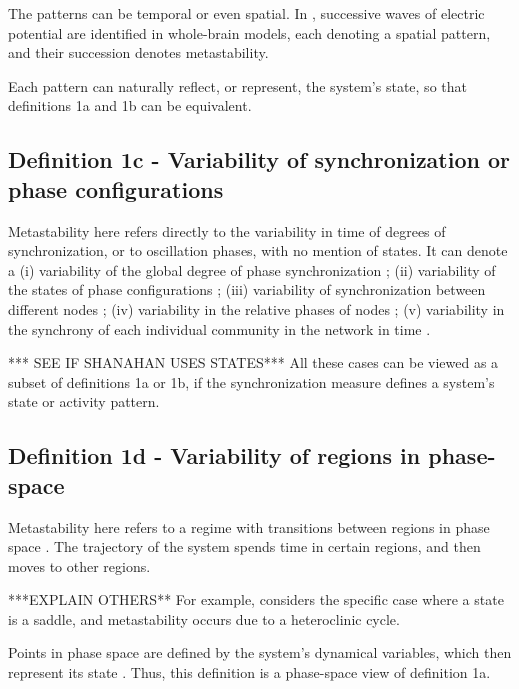 \documentclass[utf8]{frontiersSCNS} %
\begin{document}
The patterns can be temporal or even spatial. In \cite{roberts_2019}, successive waves of electric potential are identified in whole-brain models, each denoting a spatial pattern, and their succession denotes metastability.

Each pattern can naturally reflect, or represent, the system's state, so that definitions 1a and 1b can be equivalent. 



\subsection{Definition 1c - Variability of synchronization or phase configurations}
\label{ssec:metastability-synchronization}
Metastability here refers directly to the variability in time of degrees of synchronization, or to oscillation phases, with no mention of states. It can denote a (i) variability of the global degree of phase synchronization \cite{cabral_2011, deco_2017}; (ii) variability of the states of phase configurations \cite{deco_2017}; (iii) variability of synchronization between different nodes \cite{deco_2017}; (iv) variability in the relative phases of nodes \cite{poncealvarez_2015}; (v) variability in the synchrony of each individual community in the network in time \cite{shanahan_2010, wildie_2012}. 

*** SEE IF SHANAHAN USES STATES***
All these cases can be viewed as a subset of definitions 1a or 1b, if the synchronization measure defines a system's state or activity pattern. 


\subsection{Definition 1d - Variability of regions in phase-space}
Metastability here refers to a regime with transitions between regions in phase space \cite{hudson_2017, beimgraben_2019, rabinovich_2008, cavanna_2018}. The trajectory of the system spends time in certain regions, and then moves to other regions.

***EXPLAIN OTHERS**
For example, \cite{rabinovich_2008} considers the specific case where a state is a saddle, and metastability occurs due to a heteroclinic cycle.

Points in phase space are defined by the system's dynamical variables, which then represent its state \cite{cavanna_2018, beimgraben_2019}. Thus, this definition is a phase-space view of definition 1a. 
\end{document}
